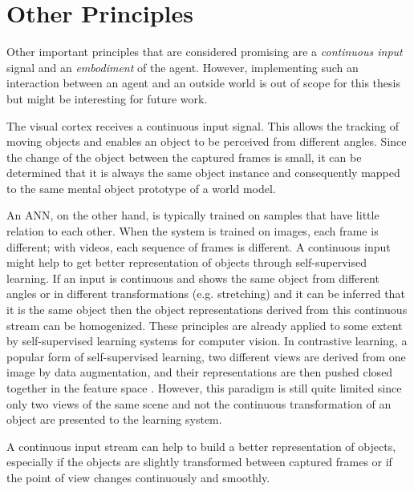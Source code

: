 \section{Other Principles}
Other important principles that are considered promising are a \emph{continuous input} signal and an \emph{embodiment} of the agent.
However, implementing such an interaction between an agent and an outside world is out of scope for this thesis but might be interesting for future work.

The visual cortex receives a continuous input signal.
This allows the tracking of moving objects and enables an object to be perceived from different angles. Since the change of the object between the captured frames is small, it can be determined that it is always the same object instance and consequently mapped to the same mental object prototype of a world model.

An ANN, on the other hand, is typically trained on samples that have little relation to each other.
When the system is trained on images, each frame is different; with videos, each sequence of frames is different.
A continuous input might help to get better representation of objects through self-supervised learning.
If an input is continuous and shows the same object from different angles or in different transformations (e.g. stretching) and it can be inferred that it is the same object then the object representations derived from this continuous stream can be homogenized.
These principles are already applied to some extent by self-supervised learning systems for computer vision.
In contrastive learning, a popular form of self-supervised learning, two different views are derived from one image by data augmentation, and their representations are then pushed closed together in the feature space .
However, this paradigm is still quite limited since only two views of the same scene and not the continuous transformation of an object are presented to the learning system.

\begin{claim}
	A continuous input stream can help to build a better representation of objects, especially if the objects are slightly transformed between captured frames or if the point of view changes continuously and smoothly.
\end{claim}


